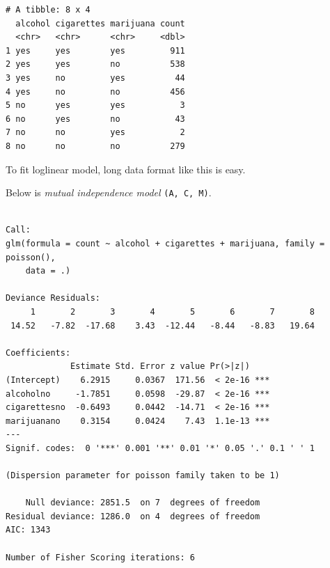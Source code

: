 \documentclass[]{book}
\newenvironment{Shaded}{\begin{snugshade}}{\end{snugshade}}
\newcommand{\DataTypeTok}[1]{\textcolor[rgb]{0.13,0.29,0.53}{#1}}
\newcommand{\KeywordTok}[1]{\textcolor[rgb]{0.13,0.29,0.53}{\textbf{#1}}}
\newcommand{\NormalTok}[1]{#1}
\newcommand{\OperatorTok}[1]{\textcolor[rgb]{0.81,0.36,0.00}{\textbf{#1}}}
\newcommand{\StringTok}[1]{\textcolor[rgb]{0.31,0.60,0.02}{#1}}
\begin{document}
\begin{verbatim}
# A tibble: 8 x 4
  alcohol cigarettes marijuana count
  <chr>   <chr>      <chr>     <dbl>
1 yes     yes        yes         911
2 yes     yes        no          538
3 yes     no         yes          44
4 yes     no         no          456
5 no      yes        yes           3
6 no      yes        no           43
7 no      no         yes           2
8 no      no         no          279
\end{verbatim}

To fit loglinear model, long data format like this is easy.

\begin{Shaded}
\end{Shaded}

Below is \emph{mutual independence model} \texttt{(A,\ C,\ M)}.

\begin{Shaded}
\end{Shaded}

\begin{verbatim}

Call:
glm(formula = count ~ alcohol + cigarettes + marijuana, family = poisson(), 
    data = .)

Deviance Residuals: 
     1       2       3       4       5       6       7       8  
 14.52   -7.82  -17.68    3.43  -12.44   -8.44   -8.83   19.64  

Coefficients:
             Estimate Std. Error z value Pr(>|z|)    
(Intercept)    6.2915     0.0367  171.56  < 2e-16 ***
alcoholno     -1.7851     0.0598  -29.87  < 2e-16 ***
cigarettesno  -0.6493     0.0442  -14.71  < 2e-16 ***
marijuanano    0.3154     0.0424    7.43  1.1e-13 ***
---
Signif. codes:  0 '***' 0.001 '**' 0.01 '*' 0.05 '.' 0.1 ' ' 1

(Dispersion parameter for poisson family taken to be 1)

    Null deviance: 2851.5  on 7  degrees of freedom
Residual deviance: 1286.0  on 4  degrees of freedom
AIC: 1343

Number of Fisher Scoring iterations: 6
\end{verbatim}
\end{document}
